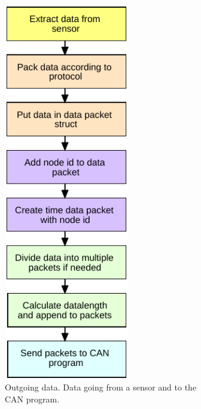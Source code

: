 \begin{figure}[!h]
\centering
\begin{subfigure}{0.45\textwidth}
\centering
\includegraphics[width=0.60\textwidth]{graphics/FlowChart_Node_Packing}
\caption{Outgoing data. Data going from a sensor and to the CAN program.}
\label{fig:filter_1}
\end{subfigure}
~
\begin{subfigure}{0.45\textwidth}
\centering

\end{subfigure}
\end{figure}
